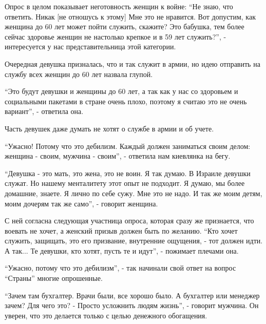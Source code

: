 \begin{multicols}{2}

Опрос в целом показывает неготовность женщин к войне: \enquote{Не знаю, что ответить.
Никак [не отношусь к этому] Мне это не нравится. Вот допустим, как женщина до
60 лет может пойти служить, скажите? Это бабушка, тем более сейчас здоровье
женщин не настолько крепкое и в 59 лет служить?}, - интересуется у нас
представительница этой категории.


Очередная девушка призналась, что и так служит в армии, но идею отправить на
службу всех женщин до 60 лет назвала глупой. 

\enquote{Это будут девушки и женщины до 60 лет, а так как у нас со здоровьем и
социальными пакетами в стране очень плохо, поэтому я считаю это не очень
вариант}, - ответила она.


Часть девушек даже думать не хотят о службе в армии и об учете. 

\enquote{Ужасно! Потому что это дебилизм. Каждый должен заниматься своим делом: женщина
- своим, мужчина - своим}, - ответила нам киевлянка на бегу. 


\enquote{Девушка - это мать, это жена, это не воин. Я так думаю. В Израиле девушки
служат. Но нашему менталитету этот опыт не подходит. Я думаю, мы более
домашние, знаете. Я лично по себе сужу. Мне это не надо. И так же моим детям,
моим дочерям так же само}, - говорит женщина.

С ней согласна следующая участница опроса, которая сразу же признается, что
воевать не хочет, а женский призыв должен быть по желанию. \enquote{Кто хочет служить,
защищать, это его призвание, внутренние ощущения, - тот должен идти. А так...
Те девушки, кто хотят, пусть те и идут}, - пожимает плечами она. 



\enquote{Ужасно, потому что это дебилизм}, - так начинали свой ответ на вопрос \enquote{Страны}
многие опрошенные. 

\enquote{Зачем там бухгалтер. Врачи были, все хорошо было. А бухгалтер или менеджер
зачем? Для чего это? - Просто усложнить людям жизнь}, - говорит мужчина. Он
уверен, что это делается только с целью денежного обогащения.


\end{multicols}
